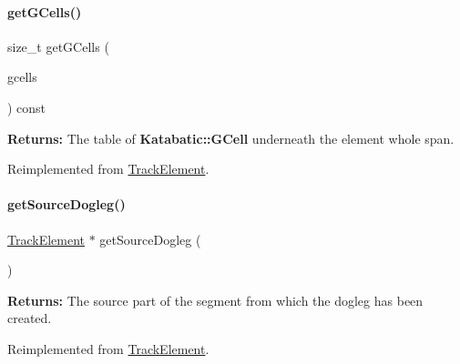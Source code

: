 \mbox{\label{classKite_1_1TrackSegment_af45301f76558f613ccb605a8f851080e}} 
\paragraph{\texorpdfstring{get\+G\+Cells()}{getGCells()}}
{\footnotesize\ttfamily size\+\_\+t get\+G\+Cells (\begin{DoxyParamCaption}\item[{Katabatic\+::\+G\+Cell\+Vector \&}]{gcells }\end{DoxyParamCaption}) const\hspace{0.3cm}{\ttfamily [virtual]}}

{\bfseries Returns\+:} The table of \textbf{ Katabatic\+::\+G\+Cell} underneath the element whole span. 

Reimplemented from \hyperlink{classKite_1_1TrackElement_af45301f76558f613ccb605a8f851080e}{Track\+Element}.

\mbox{\label{classKite_1_1TrackSegment_a7e79fbfe77f173d46b1959c41087930a}} 
\paragraph{\texorpdfstring{get\+Source\+Dogleg()}{getSourceDogleg()}}
{\footnotesize\ttfamily \hyperlink{classKite_1_1TrackElement}{Track\+Element} $\ast$ get\+Source\+Dogleg (\begin{DoxyParamCaption}{ }\end{DoxyParamCaption})\hspace{0.3cm}{\ttfamily [virtual]}}

{\bfseries Returns\+:} The source part of the segment from which the dogleg has been created. 

Reimplemented from \hyperlink{classKite_1_1TrackElement_a7e79fbfe77f173d46b1959c41087930a}{Track\+Element}.

\mbox{\label{classKite_1_1TrackSegment_aeb4e39bd925d093e6c45599433bb421c}} 

